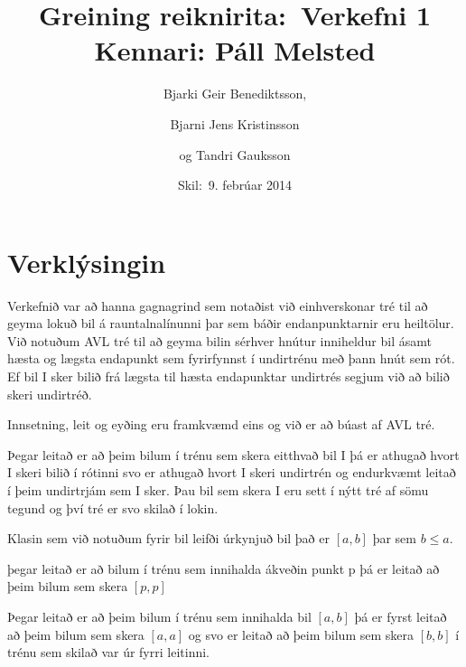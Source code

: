 \documentclass[a4paper,oneside]{article}
\title{
    Greining reiknirita:\ Verkefni 1
    \\\small{Kennari: Páll Melsted}
}
\author{Bjarki Geir Benediktsson, \and  Bjarni Jens Kristinsson \and og Tandri Gauksson}
\date{\small{Skil:\ 9. febrúar 2014}}
\begin{document}
\maketitle

\section{Verklýsingin}
Verkefnið var að hanna gagnagrind sem notaðist við einhverskonar tré til að geyma lokuð bil  á rauntalnalínunni þar sem báðir endanpunktarnir eru heiltölur.
Við notuðum AVL tré til að geyma bilin sérhver hnútur inniheldur bil ásamt hæsta og lægsta endapunkt sem fyrirfynnst í undirtrénu með þann hnút sem rót. 
Ef bil I  sker bilið frá lægsta til hæsta endapunktar undirtrés segjum við að bilið skeri undirtréð.

Innsetning, leit og eyðing eru framkvæmd eins og við er að búast af AVL tré.

Þegar leitað er að þeim bilum í trénu sem skera eitthvað bil I þá er athugað hvort I skeri bilið í rótinni 
svo er athugað hvort I skeri undirtrén og endurkvæmt leitað í þeim undirtrjám sem I sker.
Þau bil sem skera I eru sett í nýtt tré af sömu tegund og því tré er svo skilað í lokin.


Klasin sem við notuðum fyrir bil leifði úrkynjuð bil það er $[a,b]$ þar sem $b\leq a$.

þegar leitað er að bilum í trénu sem innihalda ákveðin punkt p  þá er leitað að þeim bilum sem skera  $[p,p]$ 

Þegar leitað er að þeim bilum í trénu sem innihalda bil $[a,b]$ þá er fyrst leitað að þeim bilum sem skera $[a,a]$ og svo er leitað að þeim bilum sem skera  $[b,b]$ í trénu sem skilað var úr fyrri leitinni.
\end{document}
